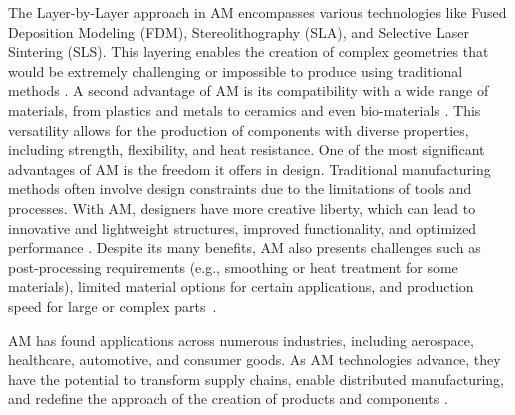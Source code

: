 \documentclass[ZLstudentexpose%
              ,optBiber%
              ,optEnglish%
              ,10pt
              ]{ZLlatex}%
\begin{document}
The Layer-by-Layer approach in AM encompasses various technologies like Fused Deposition Modeling (FDM), Stereolithography (SLA), and Selective Laser Sintering (SLS). This layering enables the creation of complex geometries that would be extremely challenging or impossible to produce using traditional methods \cite{Abdulhameed.2019}.
A second advantage of AM is its compatibility with a wide range of materials, from plastics and metals to ceramics and even bio-materials \cite{Bose.2018}. This versatility allows for the production of components with diverse properties, including strength, flexibility, and heat resistance. One of the most significant advantages of AM is the freedom it offers in design. Traditional manufacturing methods often involve design constraints due to the limitations of tools and processes. With AM, designers have more creative liberty, which can lead to innovative and lightweight structures, improved functionality, and optimized performance \cite{Plocher.2019}.
Despite its many benefits, AM also presents challenges such as post-processing requirements (e.g., smoothing or heat treatment for some materials), limited material options for certain applications, and production speed for large or complex parts~\cite{Dilberoglu.2017}.

AM has found applications across numerous industries, including aerospace, healthcare, automotive, and consumer goods. As AM technologies advance, they have the potential to transform supply chains, enable distributed manufacturing, and redefine the approach of the creation of products and components \cite{Haleem.2019}.
\end{document}
